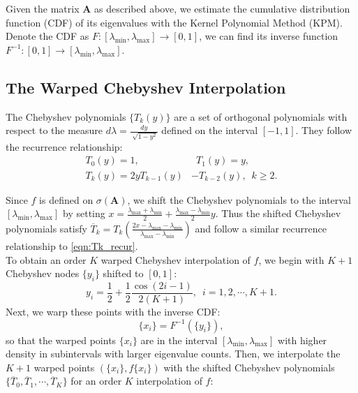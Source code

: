 \documentclass[11pt,letter]{article}
\begin{document}
Given the matrix $\mathbf{A}$ as described above, we estimate the cumulative distribution function (CDF) of its eigenvalues with the Kernel Polynomial Method (KPM). Denote the CDF as $F:[\lambda_{\min},\lambda_{\max}]\rightarrow[0,1]$, we can find its inverse function $F^{-1}:[0,1]\rightarrow[\lambda_{\min},\lambda_{\max}]$. 

\subsection{The Warped Chebyshev Interpolation}

The Chebyshev polynomials $\{T_k(y)\}$ are a set of orthogonal polynomials with respect to the measure $d\lambda=\frac{dy}{\sqrt[]{1-y^2}}$ defined on the interval $[-1,1]$. They follow the recurrence relationship:
\begin{equation}
\label{eqn:Tk_recur}
\begin{split}
T_0(y)=1,&\,\,\,T_1(y)=y,\\
T_{k}(y)=2yT_{k-1}(y)&-T_{k-2}(y),\,\,\,k\geq 2.
\end{split}
\end{equation}

Since $f$ is defined on $\sigma(\mathbf{A})$, we shift the Chebyshev polynomials to the interval $[\lambda_{\min},\lambda_{\max}]$ by setting $x=\frac{\lambda_{\max}+\lambda_{\min}}{2}+\frac{\lambda_{\max}-\lambda_{\min}}{2}y$. Thus the shifted Chebyshev polynomials satisfy $\overline{T}_k=T_k(\frac{2x-\lambda_{\max}-\lambda_{\min}}{\lambda_{\max}-\lambda_{\min}})$ and follow a similar recurrence relationship to \eqref{eqn:Tk_recur}.\\

To obtain an order $K$ warped Chebyshev interpolation of $f$, we begin with $K+1$ Chebyshev nodes $\{y_i\}$ shifted to $[0,1]$: 
\begin{equation}
\label{eqn:chebyshev_nodes_K+1}
y_i=\frac{1}{2}+\frac{1}{2}\frac{\cos(2i-1)}{2(K+1)},\,\,\,i=1,2,\cdots,K+1.
\end{equation} 
Next, we warp these points with the inverse CDF: 
\begin{equation}
\label{eqn:warp}
\{x_i\}=F^{-1}(\{y_i\}),
\end{equation}
so that the warped points $\{x_i\}$ are in the interval $[\lambda_{\min},\lambda_{\max}]$ with higher density in subintervals with larger eigenvalue counts. Then, we interpolate the $K+1$ warped points $(\{x_i\},f\{x_i\})$ with the shifted Chebyshev polynomials $\{\overline{T}_0,\overline{T}_1,\cdots,\overline{T}_K\}$ for an order $K$ interpolation of $f$:
\end{document}

